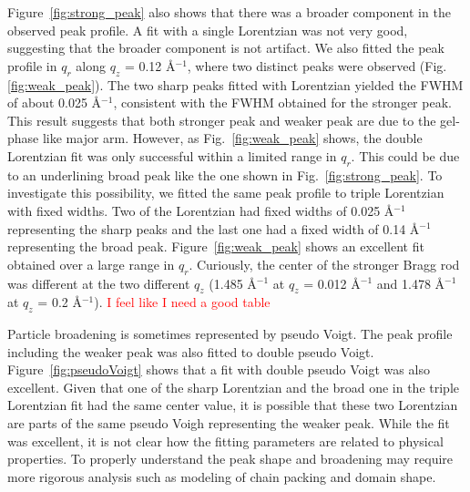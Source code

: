 Figure~\ref{fig:strong_peak} also shows that there was a broader component
in the observed peak profile. A fit with a single Lorentzian was not very
good, suggesting that the broader component is not artifact.
We also fitted the peak profile in $q_r$ along $q_z$ = 0.12 \AA$^{-1}$,
where two distinct peaks were observed (Fig.\ref{fig:weak_peak}).
The two sharp peaks fitted with Lorentzian yielded the FWHM of about 
0.025 \AA$^{-1}$, consistent with the FWHM obtained for the stronger 
peak. This result suggests that both stronger peak and weaker peak
are due to the gel-phase like major arm. However, as Fig.~\ref{fig:weak_peak}
shows, the double Lorentzian fit was only successful within a limited range
in $q_r$. This could be due to an underlining broad peak like the one
shown in Fig.~\ref{fig:strong_peak}. To investigate this possibility,
we fitted the same peak profile to triple Lorentzian with fixed widths.
Two of the Lorentzian had fixed widths of 0.025 \AA$^{-1}$ representing 
the sharp peaks and the last one had a fixed width of 0.14 \AA$^{-1}$
representing the broad peak. Figure~\ref{fig:weak_peak} shows an excellent
fit obtained over a large range in $q_r$. Curiously, the center of the stronger 
Bragg rod was different at the two different $q_z$ (1.485 \AA$^{-1}$
at $q_z$ = 0.012 \AA$^{-1}$ and 1.478 \AA$^{-1}$ at $q_z$ = 0.2 \AA$^{-1}$).
\textcolor{red}{I feel like I need a good table}

Particle broadening is sometimes represented by pseudo Voigt. The peak 
profile including the weaker peak was also fitted to double pseudo Voigt.
Figure~\ref{fig:pseudoVoigt} shows that a fit with double pseudo Voigt was
also excellent. Given that one of the sharp Lorentzian and the broad one
in the triple Lorentzian fit had the same center value, it is possible
that these two Lorentzian are parts of the same pseudo Voigh representing
the weaker peak. While the fit was excellent, it is not clear how the fitting
parameters are related to physical properties. To properly understand the
peak shape and broadening may require more rigorous analysis such as modeling
of chain packing and domain shape.

